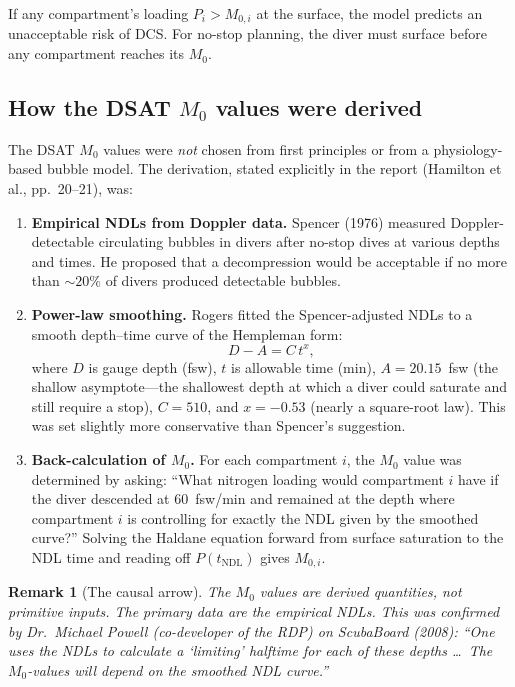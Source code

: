 \documentclass[11pt,letterpaper]{article}
\newtheorem{remark}{Remark}
\begin{document}
If any compartment's loading $P_i > M_{0,i}$ at the surface, the model
predicts an unacceptable risk of DCS.  For no-stop planning, the diver
must surface before any compartment reaches its $M_0$.

\subsection{How the DSAT $M_0$ values were derived}
\label{sec:m0derivation}

The DSAT $M_0$ values were \emph{not} chosen from first principles or from
a physiology-based bubble model.  The derivation, stated explicitly in the
report (Hamilton et al., pp.~20--21), was:

\begin{enumerate}[label=(\arabic*)]
  \item \textbf{Empirical NDLs from Doppler data.}
    Spencer (1976) measured Doppler-detectable circulating bubbles in divers
    after no-stop dives at various depths and times.  He proposed that a
    decompression would be acceptable if no more than $\sim\!20\%$ of
    divers produced detectable bubbles.

  \item \textbf{Power-law smoothing.}
    Rogers fitted the Spencer-adjusted NDLs to a smooth depth--time curve
    of the Hempleman form:
    \begin{equation}
      D - A = C\, t^x,
      \label{eq:nostop_curve}
    \end{equation}
    where $D$ is gauge depth (fsw), $t$ is allowable time (min),
    $A = 20.15$~fsw (the shallow asymptote---the shallowest depth at which
    a diver could saturate and still require a stop), $C = 510$, and
    $x = -0.53$ (nearly a square-root law).  This was set slightly
    more conservative than Spencer's suggestion.

  \item \textbf{Back-calculation of $M_0$.}
    For each compartment $i$, the $M_0$ value was determined by asking:
    ``What nitrogen loading would compartment $i$ have if the diver
    descended at 60~fsw/min and remained at the depth where compartment
    $i$ is controlling for exactly the NDL given by the smoothed curve?''
    Solving the Haldane equation forward from surface saturation to the
    NDL time and reading off $P(t_{\mathrm{NDL}})$ gives $M_{0,i}$.
\end{enumerate}

\begin{remark}[The causal arrow]
The $M_0$ values are \emph{derived quantities}, not primitive inputs.
The primary data are the empirical NDLs.  This was confirmed by
Dr.~Michael Powell (co-developer of the RDP) on ScubaBoard (2008):
``One uses the NDLs to calculate a `limiting' halftime for each of
these depths \ldots\ The $M_0$-values will depend on the smoothed NDL
curve.''
\end{remark}
\end{document}
